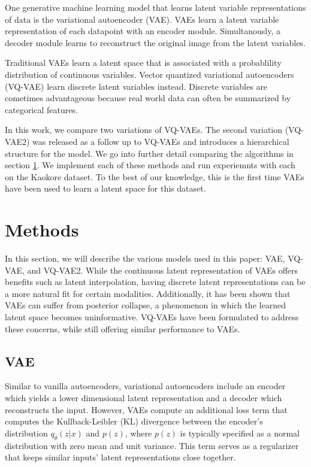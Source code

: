 \documentclass{article}
\begin{document}
One generative machine learning model that learns latent variable representations of data is the variational autoencoder (VAE). VAEs learn a latent variable representation of each datapoint with an encoder module. Simultanously, a decoder module learns to reconstruct the original image from the latent variables.

Traditional VAEs learn a latent space that is associated with a probablility distribution of continuous variables. Vector quantized variational autoencoders (VQ-VAE) learn discrete latent variables instead. Discrete variables are cometimes advantageous because real world data can often be summarized by categorical features. 

In this work, we compare two variations of VQ-VAEs. The second variation (VQ-VAE2) was released as a follow up to VQ-VAEs and introduces a hierarchical structure for the model. We go into further detail comparing the algorithms in section \ref{methods}. We implement each of these methods and run experiemnts with each on the Kaokore dataset. To the best of our knowledge, this is the first time VAEs have been used to learn a latent space for this dataset.

\section{Methods} \label{methods}
In this section, we will describe the various models used in this paper: VAE, VQ-VAE, and VQ-VAE2. While the continuous latent representation of VAEs offers benefits such as latent interpolation, having discrete latent representations can be a more natural fit for certain modalities. Additionally, it has been shown that VAEs can suffer from posterior collapse, a phenomenon in which the learned latent space becomes uninformative. VQ-VAEs have been formulated to address these concerns, while still offering similar performance to VAEs. 

\subsection{VAE}
Similar to vanilla autoencoders, variational autoencoders include an encoder which yields a lower dimensional latent representation and a decoder which reconstructs the input. However, VAEs compute an additional loss term that computes the Kullback-Leibler (KL) divergence between the encoder’s distribution \(q_{\theta}(z|x)\) and \(p(z)\), where \(p(z)\) is typically specified as a normal distribution with zero mean and unit variance. This term serves as a regularizer that keeps similar inputs’ latent representations close together.
\end{document}
